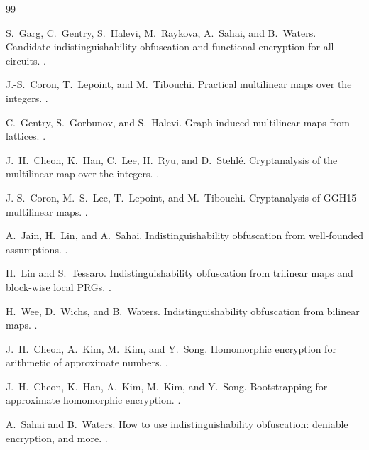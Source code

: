 \documentclass[11pt,a4paper]{article}
\begin{document}
\begin{thebibliography}{99}

S.~Garg, C.~Gentry, S.~Halevi, M.~Raykova, A.~Sahai, and B.~Waters.
\newblock Candidate indistinguishability obfuscation and functional encryption for all circuits.
.

J.-S.~Coron, T.~Lepoint, and M.~Tibouchi.
\newblock Practical multilinear maps over the integers.
.

C.~Gentry, S.~Gorbunov, and S.~Halevi.
\newblock Graph-induced multilinear maps from lattices.
.

J.~H.~Cheon, K.~Han, C.~Lee, H.~Ryu, and D.~Stehlé.
\newblock Cryptanalysis of the multilinear map over the integers.
.

J.-S.~Coron, M.~S.~Lee, T.~Lepoint, and M.~Tibouchi.
\newblock Cryptanalysis of GGH15 multilinear maps.
.

A.~Jain, H.~Lin, and A.~Sahai.
\newblock Indistinguishability obfuscation from well-founded assumptions.
.

H.~Lin and S.~Tessaro.
\newblock Indistinguishability obfuscation from trilinear maps and block-wise local PRGs.
.

H.~Wee, D.~Wichs, and B.~Waters.
\newblock Indistinguishability obfuscation from bilinear maps.
.

J.~H.~Cheon, A.~Kim, M.~Kim, and Y.~Song.
\newblock Homomorphic encryption for arithmetic of approximate numbers.
.

J.~H.~Cheon, K.~Han, A.~Kim, M.~Kim, and Y.~Song.
\newblock Bootstrapping for approximate homomorphic encryption.
.

A.~Sahai and B.~Waters.
\newblock How to use indistinguishability obfuscation: deniable encryption, and more.
.

\end{thebibliography}
\end{document}
